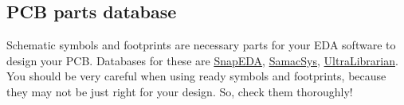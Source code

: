 \documentclass[final]{cubedoc}
\begin{document}
	\subsection{PCB parts database}
	
	Schematic symbols and footprints are necessary parts for your EDA software to design your PCB. Databases for these are \href{https://www.snapeda.com/}{SnapEDA}, \href{https://www.samacsys.com/}{SamacSys}, \href{https://www.ultralibrarian.com/}{UltraLibrarian}. You should be very careful when using ready symbols and footprints, because they may not be just right for your design. So, check them thoroughly!
	
	
	
\end{document}
